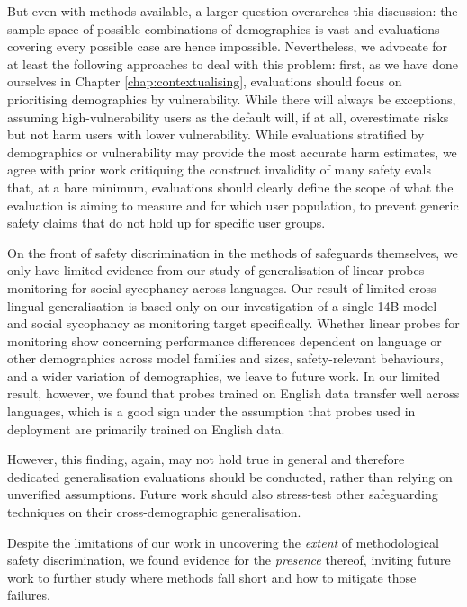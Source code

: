 But even with methods available, a larger question overarches this discussion: the sample space of possible combinations of demographics is vast and evaluations covering every possible case are hence impossible. Nevertheless, we advocate for at least the following approaches to deal with this problem: first, as we have done ourselves in Chapter \ref{chap:contextualising}, evaluations should focus on prioritising demographics by vulnerability. While there will always be exceptions, assuming high-vulnerability users as the default will, if at all, overestimate risks but not harm users with lower vulnerability. While evaluations stratified by demographics or vulnerability may provide the most accurate harm estimates, we agree with
prior work critiquing the construct invalidity of many safety evals \cite{raji2021everything, jacobs2021measurement, weidinger2025evaluationscience} that, at a bare minimum, evaluations should clearly define the scope of what the evaluation is aiming to measure and for which user population, to prevent generic safety claims that do not hold up for specific user groups.

On the front of safety discrimination in the methods of safeguards themselves, we only have limited evidence from our study of generalisation of linear probes monitoring for social sycophancy across languages. Our result of limited cross-lingual generalisation is based only on our investigation of a single 14B model and social sycophancy as monitoring target specifically. Whether linear probes for monitoring show concerning performance differences dependent on language or other demographics across model families and sizes, safety-relevant behaviours, and a wider variation of demographics, we leave to future work. In our limited result, however, we found that probes trained on English data transfer well across languages, which is a good sign under the assumption that probes used in deployment \cite{mckenzie2025detecting-612} are primarily trained on English data.

However, this finding, again, may not hold true in general and therefore dedicated generalisation evaluations should be conducted, rather than relying on unverified assumptions. Future work should also stress-test other safeguarding techniques on their cross-demographic generalisation.

Despite the limitations of our work in uncovering the \textit{extent} of methodological safety discrimination, we found evidence for the \textit{presence} thereof, inviting future work to further study where methods fall short and how to mitigate those failures.


